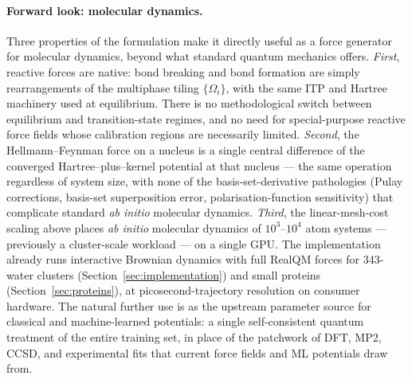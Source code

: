 \documentclass[11pt]{article}
\begin{document}
\paragraph{Forward look: molecular dynamics.}
Three properties of the formulation make it directly useful as a force generator for molecular dynamics, beyond what standard quantum mechanics offers. \emph{First}, reactive forces are native: bond breaking and bond formation are simply rearrangements of the multiphase tiling $\{\Omega_i\}$, with the same ITP and Hartree machinery used at equilibrium. There is no methodological switch between equilibrium and transition-state regimes, and no need for special-purpose reactive force fields whose calibration regions are necessarily limited. \emph{Second}, the Hellmann--Feynman force on a nucleus is a single central difference of the converged Hartree--plus--kernel potential at that nucleus --- the same operation regardless of system size, with none of the basis-set-derivative pathologies (Pulay corrections, basis-set superposition error, polarisation-function sensitivity) that complicate standard \emph{ab initio} molecular dynamics. \emph{Third}, the linear-mesh-cost scaling above places \emph{ab initio} molecular dynamics of $10^3$--$10^4$ atom systems --- previously a cluster-scale workload --- on a single GPU. The implementation already runs interactive Brownian dynamics with full RealQM forces for 343-water clusters (Section~\ref{sec:implementation}) and small proteins (Section~\ref{sec:proteins}), at picosecond-trajectory resolution on consumer hardware. The natural further use is as the upstream parameter source for classical and machine-learned potentials: a single self-consistent quantum treatment of the entire training set, in place of the patchwork of DFT, MP2, CCSD, and experimental fits that current force fields and ML potentials draw from.
\end{document}

